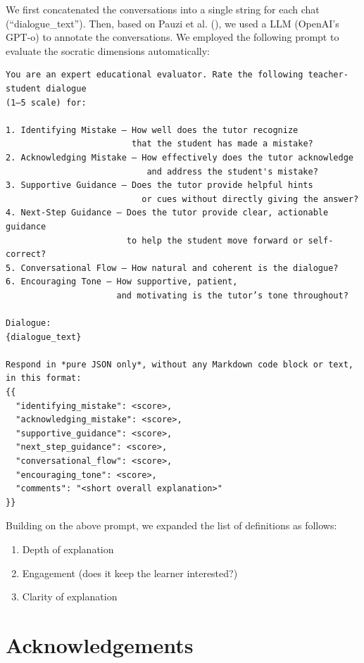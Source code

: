 \documentclass[
  11pt,
]{article}
\providecommand{\tightlist}{%
  \setlength{\itemsep}{0pt}\setlength{\parskip}{0pt}}
\begin{document}
We first concatenated the conversations into a single string for each chat (``dialogue\_text''). Then, based on Pauzi et al. (), we used a LLM (OpenAI's GPT-o) to annotate the conversations. We employed the following prompt to evaluate the socratic dimensions automatically:

\begin{verbatim}
You are an expert educational evaluator. Rate the following teacher-student dialogue 
(1–5 scale) for:

1. Identifying Mistake — How well does the tutor recognize 
                         that the student has made a mistake?
2. Acknowledging Mistake — How effectively does the tutor acknowledge 
                            and address the student's mistake?
3. Supportive Guidance — Does the tutor provide helpful hints
                           or cues without directly giving the answer?
4. Next-Step Guidance — Does the tutor provide clear, actionable guidance 
                        to help the student move forward or self-correct?
5. Conversational Flow — How natural and coherent is the dialogue?
6. Encouraging Tone — How supportive, patient, 
                      and motivating is the tutor’s tone throughout?

Dialogue:
{dialogue_text}

Respond in *pure JSON only*, without any Markdown code block or text, in this format:
{{
  "identifying_mistake": <score>,
  "acknowledging_mistake": <score>,
  "supportive_guidance": <score>,
  "next_step_guidance": <score>,
  "conversational_flow": <score>,
  "encouraging_tone": <score>,
  "comments": "<short overall explanation>"
}}
\end{verbatim}

Building on the above prompt, we expanded the list of definitions as follows:

\begin{enumerate}
\def\labelenumi{\arabic{enumi}.}
\tightlist
\item
  Depth of explanation
\item
  Engagement (does it keep the learner interested?)
\item
  Clarity of explanation
\end{enumerate}

\section{Acknowledgements}\label{acknowledgements}
\end{document}

